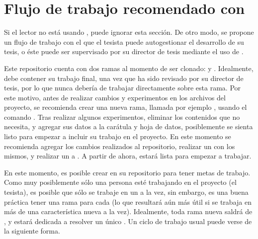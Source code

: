 \section[Uso recomendado con git]{Flujo de trabajo recomendado con }
\label{sec:git}

Si el lector no est\'a usando , puede ignorar esta
secci\'on.   De otro modo, se propone un flujo de trabajo con el que el tesista
puede autogestionar el desarrollo de su tesis, o \'este puede ser supervisado
por su director de tesis mediante el uso de .

Este repositorio cuenta con dos ramas al momento de ser clonado:  y
.   Idealmente,  debe contener su trabajo final, una
vez que ha sido revisado por su director de tesis, por lo que nunca deber\'ia de
trabajar directamente sobre esta rama.   Por este motivo, antes de realizar
cambios y experimentos en los archivos del proyecto, se recomienda crear una
nueva rama, llamada por ejemplo , usando el comando .   Tras realizar algunos experimentos, eliminar los
contenidos que no necesita, y agregar sus datos a la car\'atula y hoja de datos,
posiblemente se sienta listo para empezar a incluir su trabajo en el proyecto.
En este momento se recomienda agregar los cambios realizados al repositorio,
realizar un  con los mismos, y realizar un  a
.   A partir de ahora,  estar\'a lista para empezar a
trabajar.

En este momento, es posible crear
\href{https://guides.github.com/features/issues/}{} en su
repositorio para tener metas de trabajo.   Como muy posiblemente s\'olo una
persona est\'e trabajando en el proyecto (el tesista), es posible que s\'olo
se trabaje en un  a la vez, sin embargo, es una buena pr\'actica
tener una rama para cada  (lo que resultar\'a a\'un m\'as \'util si
se trabaja en m\'as de una caracter\'istica nueva a la vez).   Idealmente, toda
rama nueva saldr\'a de , y estar\'a dedicada a resolver un \'unico
.   Un ciclo de trabajo usual puede verse
de la siguiente forma.

